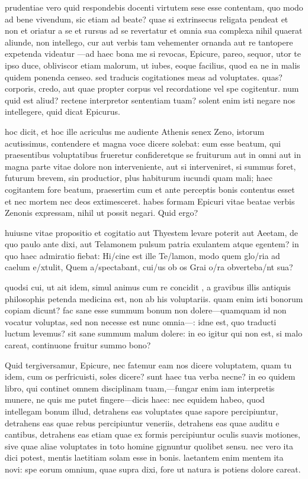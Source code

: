  prudentiae vero quid respondebis docenti virtutem sese esse contentam, quo modo ad bene vivendum, sic etiam ad beate? quae si extrinsecus religata pendeat et non et oriatur a se et rursus ad se revertatur et omnia sua complexa nihil quaerat aliunde, non intellego, cur aut verbis tam vehementer ornanda aut re tantopere expetenda videatur —ad haec bona me si revocas, Epicure, pareo, sequor, utor te ipso duce, obliviscor etiam malorum, ut iubes, eoque facilius, quod ea ne in malis quidem ponenda censeo. sed traducis cogitationes meas ad voluptates. quas? corporis, credo, aut quae propter corpus vel recordatione vel spe cogitentur. num quid est aliud? rectene interpretor sententiam tuam? solent enim isti negare nos intellegere, quid dicat Epicurus.

 hoc dicit, et hoc ille acriculus me audiente Athenis senex Zeno, istorum acutissimus, contendere et magna voce dicere solebat: eum esse beatum, qui praesentibus voluptatibus frueretur confideretque se fruiturum aut in omni aut in magna parte vitae dolore non interveniente, aut si interveniret, si summus foret, futurum brevem, sin productior, plus habiturum iucundi quam mali; haec cogitantem fore beatum, praesertim cum et ante perceptis bonis contentus esset et nec mortem nec deos extimesceret. habes formam Epicuri vitae beatae verbis Zenonis expressam, nihil ut possit negari. Quid ergo?

 huiusne vitae propositio et cogitatio aut Thyestem levare poterit aut Aeetam, de quo paulo ante dixi, aut Telamonem pulsum patria exulantem atque egentem? in quo haec admiratio fiebat: Hi/cine est ille Te/lamon, modo quem glo/ria ad caelum e/xtulit, Quem a/spectabant, cui/us ob os Grai o/ra obverteba/nt sua?

 quodsi cui, ut ait idem, simul animus cum re concidit , a gravibus illis antiquis philosophis petenda medicina est, non ab his voluptariis. quam enim isti bonorum copiam dicunt? fac sane esse summum bonum non dolere—quamquam id non vocatur voluptas, sed non necesse est nunc omnia—: idne est, quo traducti luctum levemus? sit sane summum malum dolere: in eo igitur qui non est, si malo careat, continuone fruitur summo bono?

 Quid tergiversamur, Epicure, nec fatemur eam nos dicere voluptatem, quam tu idem, cum os perfricuisti, soles dicere? sunt haec tua verba necne? in eo quidem libro, qui continet omnem disciplinam tuam,—fungar enim iam interpretis munere, ne quis me putet fingere—dicis haec: nec equidem habeo, quod intellegam bonum illud, detrahens eas voluptates quae sapore percipiuntur, detrahens eas quae rebus percipiuntur veneriis, detrahens eas quae auditu e cantibus, detrahens eas etiam quae ex formis percipiuntur oculis suavis motiones, sive quae aliae voluptates in toto homine gignuntur quolibet sensu. nec vero ita dici potest, mentis laetitiam solam esse in bonis. laetantem enim mentem ita novi: spe eorum omnium, quae supra dixi, fore ut natura is potiens dolore careat.

